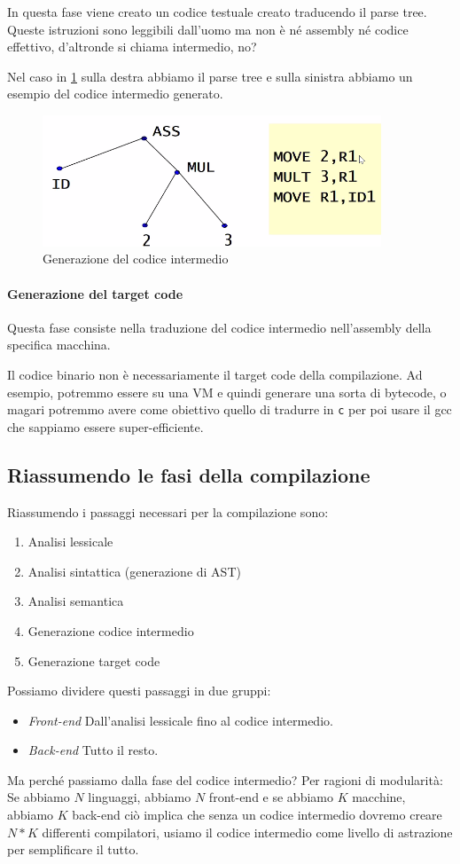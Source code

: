 \documentclass[class=book, crop=false, oneside]{standalone}
\begin{document}
In questa fase viene creato un codice testuale creato traducendo il parse tree. Queste istruzioni sono leggibili dall’uomo ma non è né assembly né codice effettivo, d’altronde si chiama intermedio, no?

Nel caso in \ref{codice_intermedio} sulla destra abbiamo il parse tree e sulla sinistra abbiamo un esempio del codice intermedio generato.
\begin{figure}[H]
	\centering
	\includegraphics[width=0.9\textwidth,keepaspectratio]{codice_intermedio}
	\caption{Generazione del codice intermedio}
	\label{codice_intermedio}
\end{figure}

\paragraph{Generazione del target code}
Questa fase consiste nella traduzione del codice intermedio nell’assembly della specifica macchina.

Il codice binario non è necessariamente il target code della compilazione. Ad esempio, potremmo essere su una VM e quindi generare una sorta di bytecode, o magari potremmo avere come obiettivo quello di tradurre in \texttt{c} per poi usare il gcc che sappiamo essere super-efficiente.


\subsection{Riassumendo le fasi della compilazione}
Riassumendo i passaggi necessari per la compilazione sono:
\begin{enumerate}
    \item Analisi lessicale
    \item Analisi sintattica (generazione di AST)
    \item Analisi semantica
    \item Generazione codice intermedio
    \item Generazione target code
\end{enumerate}
Possiamo dividere questi passaggi in due gruppi:
\begin{itemize}[]
    \item \emph{Front-end} Dall’analisi lessicale fino al codice intermedio.
    \item \emph{Back-end} Tutto il resto.
\end{itemize}

Ma perché passiamo dalla fase del codice intermedio? Per ragioni di modularità:
Se abbiamo $N$ linguaggi, abbiamo $N$ front-end e se abbiamo $K$ macchine, abbiamo $K$ back-end ciò implica che senza un codice intermedio dovremo creare $N*K$ differenti compilatori, usiamo il codice intermedio come livello di astrazione per semplificare il tutto. 
\end{document}

